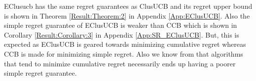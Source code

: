 EClusucb has the same regret guarantees as ClusUCB and its regret upper bound is shown in Theorem \ref{Result:Theorem:2} in Appendix \ref{App:EClusUCB}. Also the simple regret guarantee of EClusUCB is weaker than CCB\cite{liu2016modification} which is shown in Corollary \ref{Result:Corollary:3} in Appendix \ref{App:SR_EClusUCB}. But, this is expected as EClusUCB is geared towards minimizing cumulative regret whereas CCB is made for minimizing simple regret. Also we know from \cite{bubeck2009pure} that algorithms that tend to minimize cumulative regret necessarily ends up having a poorer simple regret guarantee.  




